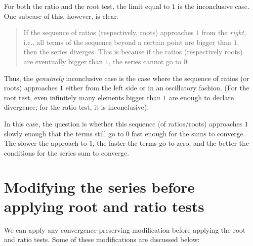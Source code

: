 \documentclass[10pt]{amsart}
\begin{document}
For both the ratio and the root test, the limit equal to $1$ is the
inconclusive case. One subcase of this, however, is clear.

\begin{quote}
  If the sequence of ratios (respectively, roots) approaches $1$ from
  the {\em right}, i.e., all terms of the sequence beyond a certain
  point are bigger than $1$, then the series diverges. This is because
  if the ratios (respectively roots) are eventually bigger than $1$,
  the series cannot go to $0$.
\end{quote}

Thus, the {\em genuinely} inconclusive case is the case where the
sequence of ratios (or roots) approaches $1$ either from the left side
or in an oscillatory fashion. (For the root test, even infinitely many
elements bigger than $1$ are enough to declare divergence; for the
ratio test, it is inconclusive).

In this case, the question is whether this sequence (of ratios/roots)
approaches $1$ slowly enough that the terms still go to $0$ fast
enough for the sums to converge. The slower the approach to $1$, the
faster the terms go to zero, and the better the conditions for the
series sum to converge.

\section{Modifying the series before applying root and ratio tests}

We can apply any convergence-preserving modification before applying
the root and ratio tests. Some of these modifications are discussed below:
\end{document}
